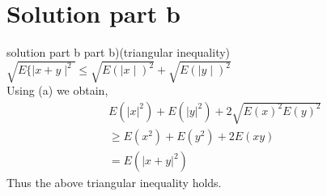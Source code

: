 \documentclass{beamer}
\begin{document}
\section{Solution part b}
\begin{frame}{solution part b}
part b)(triangular inequality)$\sqrt{E\{\mid x+y\mid^2}\le \sqrt{E(\mid x \mid)^2} + \sqrt{E(\mid y \mid)^2}$\\
Using (a) we obtain,\\
\begin{align}
&E( |x|^2) + E(|y|^2) + 2\sqrt{E(x)^2E(y)^2}\nonumber\\
&\ge E(x^2)+ E(y^2)+ 2E(xy)\nonumber\\
&=E(|x+y|^2)\nonumber
\end{align}
Thus the above triangular inequality holds.

\end{frame}
\end{document}
